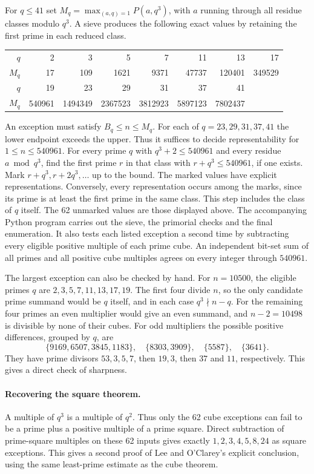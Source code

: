 For $q\le41$ set $M_q=\max_{(a,q)=1}P(a,q^3)$, with $a$ running
through all residue classes modulo $q^3$. A sieve produces the following
exact values by retaining the first prime in each reduced class.
\begin{center}
\begin{tabular}{r|rrrrrrr}
$q$ &2&3&5&7&11&13&17\\
$M_q$&17&109&1621&9371&47737&120401&349529\\ \hline
$q$&19&23&29&31&37&41&\\
$M_q$&540961&1494349&2367523&3812923&5897123&7802437&
\end{tabular}
\end{center}
An exception must satisfy $B_q\le n\le M_q$. For each of
$q=23,29,31,37,41$ the lower endpoint exceeds the upper. Thus it
suffices to decide representability for $1\le n\le540961$.
For every prime $q$ with $q^3+2\le540961$ and every residue $a\bmod q^3$,
find the first prime $r$ in that class with $r+q^3\le540961$, if one
exists. Mark $r+q^3,r+2q^3,\ldots$ up to the bound. The marked values
have explicit representations. Conversely, every representation occurs
among the marks, since its prime is at least the first prime in the
same class. This step includes the class of $q$ itself. The 62 unmarked
values are those displayed above. The accompanying Python program carries
out the sieve, the primorial checks and the final enumeration. It also
tests each listed exception a second time by subtracting every eligible
positive multiple of each prime cube. An independent bit-set sum of all primes
and all positive cube multiples agrees on every integer through $540961$.

The largest exception can also be checked by hand. For $n=10500$, the
eligible primes $q$ are $2,3,5,7,11,13,17,19$. The first four divide $n$,
so the only candidate prime summand would be $q$ itself, and in each case
$q^3\nmid n-q$. For the remaining four primes an even multiplier would
give an even summand, and $n-2=10498$ is divisible by none of their cubes.
For odd multipliers the possible positive differences, grouped by $q$,
are
\[
 \{9169,6507,3845,1183\},\quad \{8303,3909\},\quad
 \{5587\},\quad \{3641\}.
\]
They have prime divisors $53,3,5,7$, then $19,3$, then $37$ and $11$,
respectively. This gives a direct check of sharpness.

\paragraph{Recovering the square theorem.}
A multiple of $q^3$ is a multiple of $q^2$. Thus only the 62 cube
exceptions can fail to be a prime plus a positive multiple of a prime
square. Direct subtraction of prime-square multiples on these 62 inputs
gives exactly $1,2,3,4,5,8,24$ as square exceptions. This gives a second
proof of Lee and O'Clarey's explicit conclusion, using the same
least-prime estimate as the cube theorem.

